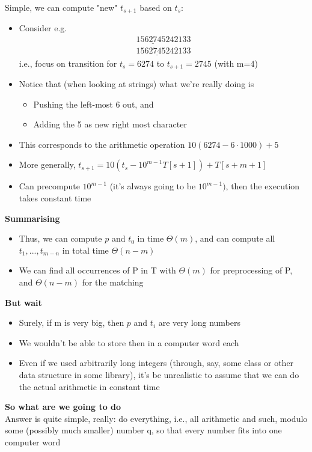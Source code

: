\documentclass{article}[18pt]
\begin{document}
Simple, we can compute "new" $t_{s+1}$ based on $t_s$:
\begin{itemize}
	\item Consider e.g.
	\[ 
	\begin{array}{l}{15\underline{6274}5242133} \\ {156\underline{2745}242133}\end{array}
	\]
	i.e., focus on transition for $t_s=6274$ to $t_{s+1}=2745$ (with m=4)
	\item Notice that (when looking at strings) what we're really doing is
	\begin{itemize}
		\item Pushing the left-most 6 out, and
		\item Adding the 5 as new right most character
	\end{itemize}
	\item This corresponds to the arithmetic operation $10(6274-6\cdot 1000)+5$
	\item More generally, $t_{s+1}=10\left(t_{s}-10^{m-1} T[s+1]\right)+T[s+m+1]$
	\item Can precompute $10^{m-1}$ (it's always going to be $10^{m-1})$, then the execution takes constant time
\end{itemize}
\textbf{Summarising}
\begin{itemize}
	\item Thus, we can compute $p$ and $t_0$ in time $\Theta(m)$, and can compute all $t_1,...,t_{m-n}$ in total time $\Theta(n-m)$
	\item We can find all occurrences of P in T with $\Theta(m)$ for preprocessing of P, and $\Theta(n-m)$ for the matching
\end{itemize}
\textbf{But wait}
\begin{itemize}
	\item Surely, if m is very big, then $p$ and $t_i$ are very long numbers
	\item We wouldn't be able to store then in a computer word each
	\item Even if we used arbitrarily long integers (through, say, some class or other data structure in some library), it's be unrealistic to assume that we can do the actual arithmetic in constant time
\end{itemize}
\textbf{So what are we going to do}\\
Answer is quite simple, really: do everything, i.e., all arithmetic and such, modulo some (possibly much smaller) number q, so that every number fits into one computer word
\end{document}
